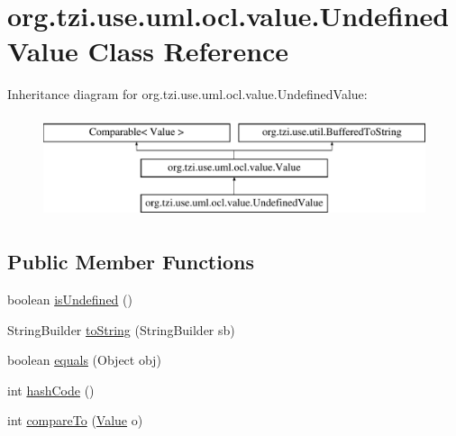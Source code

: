 \hypertarget{classorg_1_1tzi_1_1use_1_1uml_1_1ocl_1_1value_1_1_undefined_value}{\section{org.\-tzi.\-use.\-uml.\-ocl.\-value.\-Undefined\-Value Class Reference}
\label{classorg_1_1tzi_1_1use_1_1uml_1_1ocl_1_1value_1_1_undefined_value}
}
Inheritance diagram for org.\-tzi.\-use.\-uml.\-ocl.\-value.\-Undefined\-Value\-:\begin{figure}[H]
\begin{center}
\leavevmode
\includegraphics[height=3.000000cm]{classorg_1_1tzi_1_1use_1_1uml_1_1ocl_1_1value_1_1_undefined_value}
\end{center}
\end{figure}
\subsection*{Public Member Functions}
\begin{DoxyCompactItemize}
\item 
boolean \hyperlink{classorg_1_1tzi_1_1use_1_1uml_1_1ocl_1_1value_1_1_undefined_value_a31c0e3d6aafc387af6faf67ce6954f06}{is\-Undefined} ()
\item 
String\-Builder \hyperlink{classorg_1_1tzi_1_1use_1_1uml_1_1ocl_1_1value_1_1_undefined_value_aaa1391301b2648d66ac7ab56601d1893}{to\-String} (String\-Builder sb)
\item 
boolean \hyperlink{classorg_1_1tzi_1_1use_1_1uml_1_1ocl_1_1value_1_1_undefined_value_ace0147b9f7a4f1aabfaa4319dbede741}{equals} (Object obj)
\item 
int \hyperlink{classorg_1_1tzi_1_1use_1_1uml_1_1ocl_1_1value_1_1_undefined_value_ac59d9f0ca59e150ae9f26d9127a04158}{hash\-Code} ()
\item 
int \hyperlink{classorg_1_1tzi_1_1use_1_1uml_1_1ocl_1_1value_1_1_undefined_value_aa6e2d16048db6770394c67c09f995a42}{compare\-To} (\hyperlink{classorg_1_1tzi_1_1use_1_1uml_1_1ocl_1_1value_1_1_value}{Value} o)
\end{DoxyCompactItemize}
